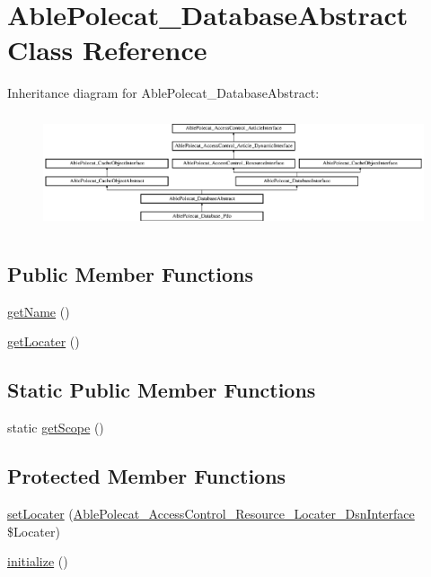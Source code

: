 \hypertarget{class_able_polecat___database_abstract}{}\section{Able\+Polecat\+\_\+\+Database\+Abstract Class Reference}
\label{class_able_polecat___database_abstract}
Inheritance diagram for Able\+Polecat\+\_\+\+Database\+Abstract\+:\begin{figure}[H]
\begin{center}
\leavevmode
\includegraphics[height=3.414634cm]{class_able_polecat___database_abstract}
\end{center}
\end{figure}
\subsection*{Public Member Functions}
\begin{DoxyCompactItemize}
\item 
\hyperlink{class_able_polecat___database_abstract_a3d0963e68bb313b163a73f2803c64600}{get\+Name} ()
\item 
\hyperlink{class_able_polecat___database_abstract_a66e49cc03d1511ec4c0290ffaa688079}{get\+Locater} ()
\end{DoxyCompactItemize}
\subsection*{Static Public Member Functions}
\begin{DoxyCompactItemize}
\item 
static \hyperlink{class_able_polecat___database_abstract_ad9ade868bd136d32967059d1cccb3e92}{get\+Scope} ()
\end{DoxyCompactItemize}
\subsection*{Protected Member Functions}
\begin{DoxyCompactItemize}
\item 
\hyperlink{class_able_polecat___database_abstract_ac30bce81b062d34591a9ed8387c360d4}{set\+Locater} (\hyperlink{interface_able_polecat___access_control___resource___locater___dsn_interface}{Able\+Polecat\+\_\+\+Access\+Control\+\_\+\+Resource\+\_\+\+Locater\+\_\+\+Dsn\+Interface} \$Locater)
\item 
\hyperlink{class_able_polecat___database_abstract_a91098fa7d1917ce4833f284bbef12627}{initialize} ()
\end{DoxyCompactItemize}
